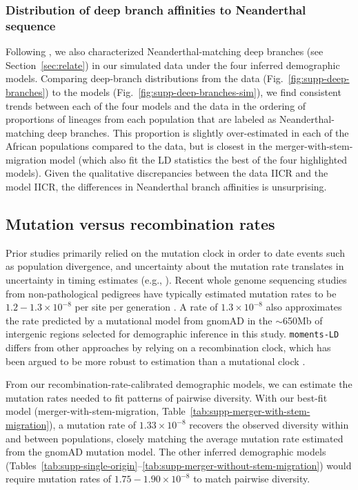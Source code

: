 \documentclass[]{article}
\begin{document}
\subsubsection{Distribution of deep branch affinities to Neanderthal sequence}

Following \citet{Speidel2019-nj}, we also characterized Neanderthal-matching
deep branches (see Section~\ref{sec:relate}) in our simulated data under the
four inferred demographic models. Comparing deep-branch distributions from the
data (Fig.~\ref{fig:supp-deep-branches}) to the models
(Fig.~\ref{fig:supp-deep-branches-sim}), we find consistent trends between each
of the four models and the data in the ordering of proportions of lineages from
each population that are labeled as Neanderthal-matching deep branches. This
proportion is slightly over-estimated in each of the African populations
compared to the data, but is closest in the merger-with-stem-migration model
(which also fit the LD statistics the best of the four highlighted models).
Given the qualitative discrepancies between the data IICR and the model IICR,
the differences in Neanderthal branch affinities is unsurprising.

\subsection{Mutation versus recombination rates}
\label{sec:supp-mutation}

Prior studies primarily relied on the mutation clock in order to date events
such as population divergence, and uncertainty about the mutation rate
translates in uncertainty in timing estimates (e.g., \citet{Moorjani2016-qj}).
Recent whole genome sequencing studies from non-pathological pedigrees have
typically estimated mutation rates to be $1.2-1.3\times10^{-8}$ per site per
generation \citep{Sasani2019-zp,Tian2019-zv}. A rate of $1.3\times10^{-8}$ also
approximates the rate predicted by a mutational model from gnomAD
\citep{Karczewski2020-le} in the $\sim$650Mb of intergenic regions selected for
demographic inference in this study.
\texttt{moments-LD} differs from other approaches by
relying on a recombination clock, which has been argued to be more robust to
estimation than a mutational clock \citep{Moorjani2016-ur}.

From our recombination-rate-calibrated demographic models, we can estimate the
mutation rates needed to fit patterns of pairwise diversity. With our best-fit
model (merger-with-stem-migration,
Table~\ref{tab:supp-merger-with-stem-migration}), a mutation rate of
$1.33\times10^{-8}$ recovers the observed diversity within and between
populations, closely matching the average mutation rate estimated from the
gnomAD mutation model. The other inferred demographic models
(Tables~\ref{tab:supp-single-origin}--\ref{tab:supp-merger-without-stem-migration})
would require mutation rates of $1.75-1.90\times10^{-8}$ to match pairwise
diversity.
\end{document}
